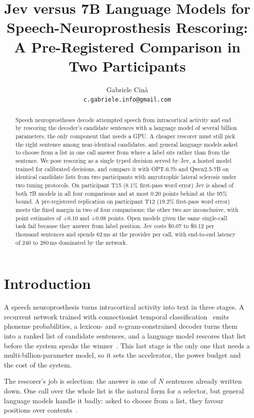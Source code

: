 \documentclass[11pt]{article}
\title{Jev versus 7B Language Models for Speech-Neuroprosthesis Rescoring:\\
A Pre-Registered Comparison in Two Participants}
\author{Gabriele Cin\`a \\ \texttt{c.gabriele.info@gmail.com}}
\begin{document}
\maketitle

\begin{abstract}
Speech neuroprostheses decode attempted speech from intracortical activity and end by rescoring
the decoder's candidate sentences with a language model of several billion parameters, the only
component that needs a GPU. A cheaper rescorer must still pick the right sentence among
near-identical candidates, and general language models asked to choose from a list in one call
answer from where a label sits rather than from the sentence. We pose rescoring as a single typed
decision served by Jev, a hosted model trained for calibrated decisions, and compare it with
OPT-6.7b and Qwen2.5-7B on identical candidate lists from two participants with amyotrophic lateral
sclerosis under two tuning protocols. On participant T15 (8.1\% first-pass word error) Jev is ahead of both 7B models
in all four comparisons and at most 0.20 points behind at the 95\% bound. A pre-registered
replication on participant T12 (19.2\% first-pass word error) meets the fixed margin in two of four
comparisons; the other two are inconclusive, with point estimates of $+0.10$ and $+0.08$ points.
Open models given the same single-call task fail because they answer from label position. Jev costs \$0.07 to
\$0.12 per thousand sentences and spends 62\,ms at the provider per call, with end-to-end latency
of 240 to 280\,ms dominated by the network.
\end{abstract}

\section{Introduction}

A speech neuroprosthesis turns intracortical activity into text in three stages. A recurrent
network trained with connectionist temporal classification~\citep{graves2006ctc} emits phoneme
probabilities, a lexicon- and $n$-gram-constrained decoder turns them into a ranked list of
candidate sentences, and a language model rescores that list before the system speaks the
winner~\citep{willett2023,card2024}. This last stage is the only one that needs a
multi-billion-parameter model, so it sets the accelerator, the power budget and the cost of the
system.

The rescorer's job is selection: the answer is one of $N$ sentences already written down. One call
over the whole list is the natural form for a selector, but general language models handle it
badly: asked to choose from a list, they favour positions over
contents~\citep{tang2023psc,bito2026position}.
\end{document}
